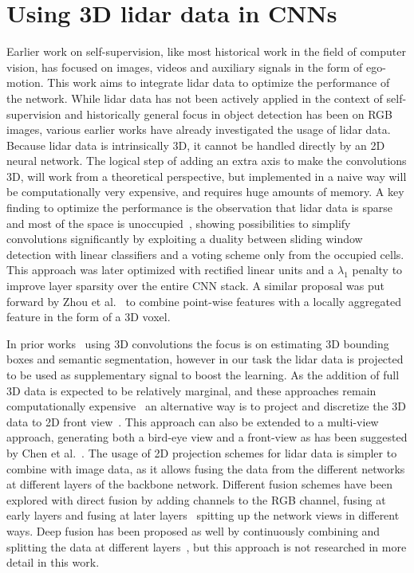 \section{Using 3D lidar data in CNNs}
Earlier work on self-supervision, like most historical work in the field of computer vision, has focused on images, videos and auxiliary signals in the form of ego-motion. This work aims to integrate lidar data to optimize the performance of the network. While lidar data has not been actively applied in the context of self-supervision and historically general focus in object detection has been on RGB images, various earlier works have already investigated the usage of lidar data. Because lidar data is intrinsically 3D, it cannot be handled directly by an 2D neural network. The logical step of adding an extra axis to make the convolutions 3D, will work from a theoretical perspective, but implemented in a naive way will be computationally very expensive, and requires huge amounts of memory. A key finding to optimize the performance is the observation that lidar data is sparse and most of the space is unoccupied~\cite{wang2015vote}, showing possibilities to simplify convolutions significantly by exploiting a duality between sliding window detection with linear classifiers and a voting scheme only from the occupied cells. This approach was later optimized with rectified linear units and a $\lambda_1$ penalty to improve layer sparsity over the entire CNN stack\cite{engelcke2017}. A similar proposal was put forward by Zhou et al.~\cite{zhou2017voxelnet} to combine point-wise features with a locally aggregated feature in the form of a 3D voxel. 

In prior works~\cite{engelcke2017,zhou2017voxelnet,wang2015} using 3D convolutions the focus is on estimating 3D bounding boxes and semantic segmentation, however in our task the lidar data is projected to be used as supplementary signal to boost the learning. As the addition of full 3D data is expected to be relatively marginal, and these approaches remain computationally expensive~\cite{chen2017} an alternative way is to project and discretize the 3D data to 2D front view~\cite{li2016}. This approach can also be extended to a multi-view approach, generating both a bird-eye view and a front-view as has been suggested by Chen et al.~\cite{chen2017}. The usage of 2D projection schemes for lidar data is simpler to combine with image data, as it allows fusing the data from the different networks at different layers of the backbone network. Different fusion schemes have been explored with direct fusion by adding channels to the RGB channel, fusing at early layers and fusing at later layers~\cite{schlosser2016} spitting up the network views in different ways. Deep fusion has been proposed as well by continuously combining and splitting the data at different layers~\cite{chen2017}, but this approach is not researched in more detail in this work.

